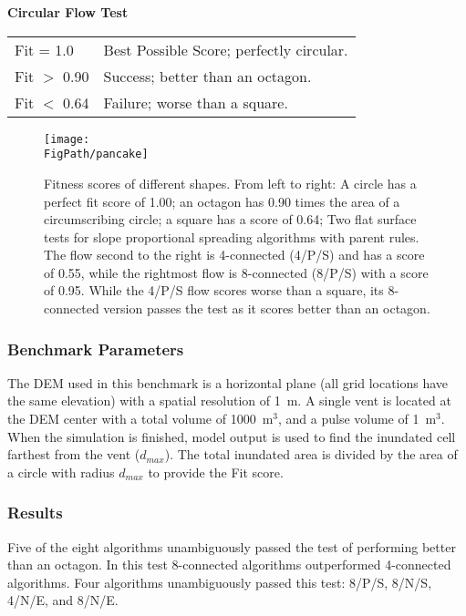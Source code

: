 			\begin{center}
				\textbf{Circular Flow Test}
				
				\begin{tabular}{l l}
					\toprule
					Fit = 1.0 & Best Possible Score; perfectly circular.\\
					Fit $>$ 0.90 & Success; better than an octagon. \\
					Fit $<$ 0.64 & Failure; worse than a square.\\
					\bottomrule
				\end{tabular}
			\end{center}
		
		\begin{figure}[!h]
		\centering
		\texttt{[image: \\FigPath/pancake]}
		\caption[Fitness scores of different shaped flows on a flat surface]{Fitness scores of different shapes. From left to right: A circle has a perfect fit score of 1.00; an octagon has 0.90 times the area of a circumscribing circle; a square has a score of 0.64; Two flat surface tests for slope proportional spreading algorithms with parent rules. The flow second to the right is 4-connected (4/P/S) and has a score of 0.55, while the rightmost flow is 8-connected (8/P/S) with a score of 0.95. While the 4/P/S flow scores worse than a square, its 8-connected version passes the test as it scores better than an octagon.}
		\label{fig_pancake}
	\end{figure}
	
		\subsubsection{Benchmark Parameters} The DEM used in this benchmark is a horizontal plane (all grid locations have the same elevation) with a spatial resolution of 1~m. A single vent is located at the DEM center with a total volume of 1000~m$^3$, and a pulse volume of 1~m$^3$. When the simulation is finished, model output is used to find the inundated cell farthest from the vent ($d_{max}$). The total inundated area is divided by the area of a circle with radius $d_{max}$ to provide the Fit score.
		
		\subsubsection{Results}

		Five of the eight algorithms unambiguously passed the test of performing better than an octagon. In this test 8-connected algorithms outperformed 4-connected algorithms. Four algorithms unambiguously passed this test: 8/P/S, 8/N/S, 4/N/E, and 8/N/E.
		
